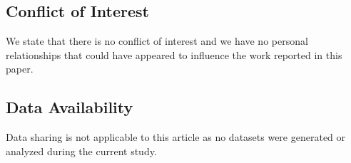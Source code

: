 \documentclass[12pt]{amsart}
\numberwithin{equation}{section}
\theoremstyle{plain}
\newtheorem{lemma}[theorem]{Lemma}
\newcommand{\ot}{\otimes}
\newcommand{\wt}{\widetilde}
\newcommand{\wT}{\wt{T}}
\begin{document}




\subsection*{Conflict of Interest}
We state that there is no conflict of interest and we have no personal relationships that could have appeared to influence the work reported in this paper.

\subsection*{Data Availability}
Data sharing is not applicable to this article as no datasets were generated or analyzed during the current study.
\end{document}
